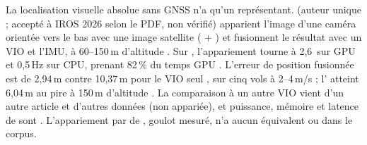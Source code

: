 La localisation visuelle absolue sans GNSS n'a qu'un représentant.
\citet{arxiv-2607.18936-ngps-gps-denied-aerial-geo}\pp{} (auteur unique ; accepté à IROS 2026
selon le PDF, non vérifié) apparient l'image d'une caméra orientée vers le bas avec une
image satellite ( + ) et fusionnent le résultat avec un VIO et l'IMU,
à 60--150\,m d'altitude . Sur , l'appariement tourne à 2,6\, sur GPU et
0,5\,Hz sur CPU,  prenant 82\,\% du temps GPU \med. L'erreur de position
fusionnée est de 2,94\,m contre 10,37\,m pour le VIO seul \med, sur cinq
vols à 2--4\,m/s ; l' atteint 6,04\,m au pire à 150\,m d'altitude . La comparaison à
un autre VIO vient d'un autre article et d'autres données (non appariée), et puissance,
mémoire et latence de  sont \nr. L'appariement par  de
, goulot mesuré, n'a aucun équivalent  ou  dans le corpus.
